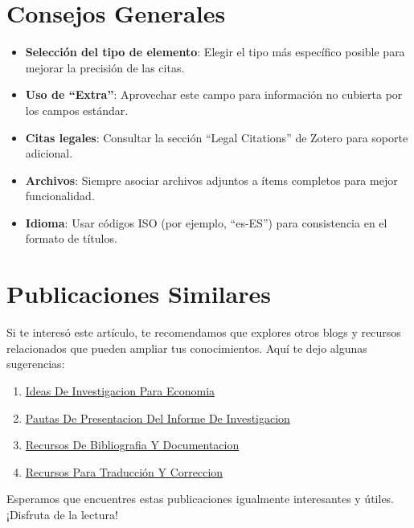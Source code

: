 \documentclass[
  jou,
  floatsintext,
  longtable,
  a4paper,
  nolmodern,
  notxfonts,
  notimes,
  colorlinks=true,linkcolor=blue,citecolor=blue,urlcolor=blue]{apa7}
\providecommand{\tightlist}{%
  \setlength{\itemsep}{0pt}\setlength{\parskip}{0pt}}
\begin{document}
\section{Consejos Generales}\label{consejos-generales}

\begin{itemize}
\tightlist
\item
  \textbf{Selección del tipo de elemento}: Elegir el tipo más específico
  posible para mejorar la precisión de las citas.
\item
  \textbf{Uso de ``Extra''}: Aprovechar este campo para información no
  cubierta por los campos estándar.
\item
  \textbf{Citas legales}: Consultar la sección ``Legal Citations'' de
  Zotero para soporte adicional.
\item
  \textbf{Archivos}: Siempre asociar archivos adjuntos a ítems completos
  para mejor funcionalidad.
\item
  \textbf{Idioma}: Usar códigos ISO (por ejemplo, ``es-ES'') para
  consistencia en el formato de títulos.
\end{itemize}

\section{Publicaciones Similares}\label{publicaciones-similares}

Si te interesó este artículo, te recomendamos que explores otros blogs y
recursos relacionados que pueden ampliar tus conocimientos. Aquí te dejo
algunas sugerencias:

\begin{enumerate}
\def\labelenumi{\arabic{enumi}.}
\tightlist
\item
  \href{https://achalmaedison.netlify.app/investigacion-metodologia/posts/2023-06-03-ideas-de-investigacion-para-economia/index.pdf}{}
  \href{https://achalmaedison.netlify.app/investigacion-metodologia/posts/2023-06-03-ideas-de-investigacion-para-economia}{Ideas
  De Investigacion Para Economia}
\item
  \href{https://achalmaedison.netlify.app/investigacion-metodologia/posts/2023-06-03-pautas-de-presentacion-del-informe-de-investigacion/index.pdf}{}
  \href{https://achalmaedison.netlify.app/investigacion-metodologia/posts/2023-06-03-pautas-de-presentacion-del-informe-de-investigacion}{Pautas
  De Presentacion Del Informe De Investigacion}
\item
  \href{https://achalmaedison.netlify.app/investigacion-metodologia/posts/2025-01-12-recursos-de-bibliografia-y-documentacion/index.pdf}{}
  \href{https://achalmaedison.netlify.app/investigacion-metodologia/posts/2025-01-12-recursos-de-bibliografia-y-documentacion}{Recursos
  De Bibliografia Y Documentacion}
\item
  \href{https://achalmaedison.netlify.app/investigacion-metodologia/posts/2025-02-09-recursos-para-traducción-y-correccion/index.pdf}{}
  \href{https://achalmaedison.netlify.app/investigacion-metodologia/posts/2025-02-09-recursos-para-traducción-y-correccion}{Recursos
  Para Traducción Y Correccion}
\end{enumerate}

Esperamos que encuentres estas publicaciones igualmente interesantes y
útiles. ¡Disfruta de la lectura!
\end{document}
